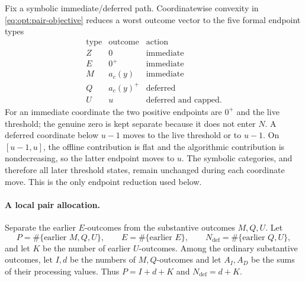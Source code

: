 Fix a symbolic immediate/deferred path.  Coordinatewise convexity in
\eqref{eq:opt:pair-objective} reduces a worst outcome vector to the five
formal endpoint types
\begin{equation}
\begin{array}{c|c|c}
 \text{type}&\text{outcome}&\text{action}\\ \hline
 Z&0&\text{immediate}\\
 E&0^+&\text{immediate}\\
 M&a_c(y)&\text{immediate}\\
 Q&a_c(y)^+&\text{deferred}\\
 U&u&\text{deferred and capped}.
\end{array}
 \label{eq:opt:five-endpoints}
\end{equation}
For an immediate coordinate the two positive endpoints are $0^+$ and
the live threshold; the genuine zero is kept separate because it does not
enter $N$.  A deferred coordinate below $u-1$ moves to the live
threshold or to $u-1$.  On $[u-1,u]$, the offline contribution is flat
and the algorithmic contribution is nondecreasing, so the latter endpoint
moves to $u$.  The symbolic categories, and therefore all later
threshold states, remain unchanged during each coordinate move.  This is
the only endpoint reduction used below.

\paragraph{A local pair allocation.}
Separate the earlier $E$-outcomes from the substantive outcomes
$M,Q,U$.  Let
\[
 P=\#\{\text{earlier }M,Q,U\},\qquad
 E=\#\{\text{earlier }E\},\qquad
 N_{\mathrm{def}}=\#\{\text{earlier }Q,U\},
\]
and let $K$ be the number of earlier $U$-outcomes.  Among the ordinary
substantive outcomes, let $I,d$ be the numbers of $M,Q$-outcomes and
let $A_I,A_D$ be the sums of their processing values.  Thus
$P=I+d+K$ and $N_{\mathrm{def}}=d+K$.

